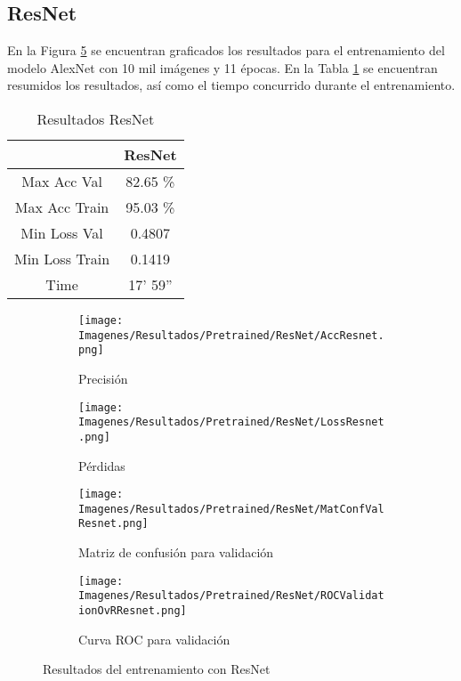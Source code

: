 \documentclass{report}
\begin{document}
\newpage
\subsection{ResNet}


En la Figura \ref{fig:RResNet} se encuentran graficados los resultados para el entrenamiento del modelo AlexNet con 10 mil imágenes y 11 épocas. En la Tabla \ref{tab:RResNet} se encuentran resumidos los resultados, así como el tiempo concurrido durante el entrenamiento.


\begin{table}[H]
\centering
\begin{tabular}{|c|c|}
\hline
\cellcolor[HTML]{FFFFFF}{\color[HTML]{000000} Modelo} & ResNet \\ \hline
Max Acc Val                                           & 82.65 \%        \\ \hline
Max Acc Train                                         & 95.03 \%       \\ \hline
Min Loss Val                                          & 0.4807        \\ \hline
Min Loss Train                                        & 0.1419        \\ \hline
Time                                                  & 17' 59''        \\ \hline
\end{tabular}
\caption{Resultados ResNet}
\label{tab:RResNet}
\end{table}


\vspace{0.4cm}
\begin{figure}[H]
	 	\centering
	 	\begin{subfigure}[b]{0.45\linewidth}
	 	\centering
	 		\texttt{[image: Imagenes/Resultados/Pretrained/ResNet/AccResnet.png]}
	 		\caption{ Precisión }
                    \label{fig:ResnetPrecision}
	 	\end{subfigure}
	 	\begin{subfigure}[b]{0.45\linewidth}
	 	\centering
	 		\texttt{[image: Imagenes/Resultados/Pretrained/ResNet/LossResnet.png]}
                    \caption{ Pérdidas }
                    \label{fig:ResnetLoss}
	 	\end{subfigure}
	 	\centering
	 	\begin{subfigure}[b]{0.45\linewidth}
	 	\centering
	 		\texttt{[image: Imagenes/Resultados/Pretrained/ResNet/MatConfValResnet.png]}
	 		\caption{ Matriz de confusión para validación }
                    \label{fig:ResnetMatConf}
	 	\end{subfigure}
	 	\centering
	 	\begin{subfigure}[b]{0.45\linewidth}
	 	\centering
	 		\texttt{[image: Imagenes/Resultados/Pretrained/ResNet/ROCValidationOvRResnet.png]}
	 		\caption{ Curva ROC para validación }
                    \label{fig:ResnetCurvaROC}
	 	\end{subfigure}
	 	\caption{ Resultados del entrenamiento con ResNet}
	 	\label{fig:RResNet}
\end{figure}
\end{document}
